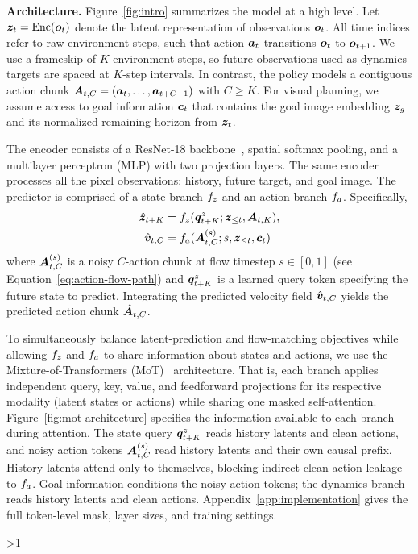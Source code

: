 \documentclass{article} %
\makeatletter
\newcommand{\finishwrapfigure}{%
  \par
  \ifnum\value{WF@wrappedlines}>1
    \vspace{\dimexpr\value{WF@wrappedlines}\baselineskip-\baselineskip\relax}%
  \fi
  \WFclear
}
\newcommand{\lead}[1]{\textbf{#1}}
\makeatother
\begin{document}
\lead{Architecture.} Figure~\ref{fig:intro} summarizes the model at a high level. Let ${\bm{z}}_t=\operatorname{Enc}({\bm{o}}_t)$ denote the latent representation of observations ${\bm{o}}_t$. All time indices refer to raw environment steps, such that action ${\bm{a}}_t$ transitions ${\bm{o}}_t$ to ${\bm{o}}_{t+1}$. We use a frameskip of $K$ environment steps, so future observations used as dynamics targets are spaced at $K$-step intervals. In contrast, the policy models a contiguous action chunk ${\bm{A}}_{t,C} = ({\bm{a}}_t,\dots,{\bm{a}}_{t+C-1})$ with $C\geq K$. For visual planning, we assume access to goal information ${\bm{c}}_t$ that contains the goal image embedding ${\bm{z}}_g$ and its normalized remaining horizon from ${\bm{z}}_t$.

The encoder consists of a ResNet-18 backbone~\citep{he2016resnet}, spatial softmax pooling, and a multilayer perceptron (MLP) with two projection layers. The same encoder processes all the pixel observations: history, future target, and goal image. The predictor is comprised of a state branch $f_z$ and an action branch $f_a$. Specifically,
\begin{equation}
    \begin{aligned}
        \hat{{\bm{z}}}_{t+K}
        &=f_z({\bm{q}}^z_{t+K};{\bm{z}}_{\leq t},{\bm{A}}_{t,K}),\\
        \hat{{\bm{v}}}_{t,C} &=f_a({\bm{A}}_{t,C}^{(s)};s,{\bm{z}}_{\leq t},{\bm{c}}_t)
    \end{aligned}
    \label{eq:lewam-interface}
\end{equation}
where ${\bm{A}}_{t,C}^{(s)}$ is a noisy $C$-action chunk at flow timestep $s\in[0,1]$ (see Equation~\ref{eq:action-flow-path}) and ${\bm{q}}^z_{t+K}$ is a learned query token specifying the future state to predict. Integrating the predicted velocity field $\hat{{\bm{v}}}_{t,C}$ yields the predicted action chunk $\hat{{\bm{A}}}_{t,C}$.

To simultaneously balance latent-prediction and flow-matching objectives while allowing $f_z$ and $f_a$ to share information about states and actions, we use the Mixture-of-Transformers (MoT)~\citep{liang2025MoT} architecture. That is, each branch applies independent query, key, value, and feedforward projections for its respective modality (latent states or actions) while sharing one masked self-attention. Figure~\ref{fig:mot-architecture} specifies the information available to each branch during attention. The state query ${\bm{q}}^z_{t+K}$ reads history latents and clean actions, and noisy action tokens ${\bm{A}}_{t,C}^{(s)}$ read history latents and their own causal prefix. History latents attend only to themselves, blocking indirect clean-action leakage to $f_a$.
Goal information conditions the noisy action tokens; the dynamics branch reads history latents and clean actions.
Appendix~\ref{app:implementation} gives the full token-level mask, layer sizes, and training settings.
\finishwrapfigure %
\end{document}
